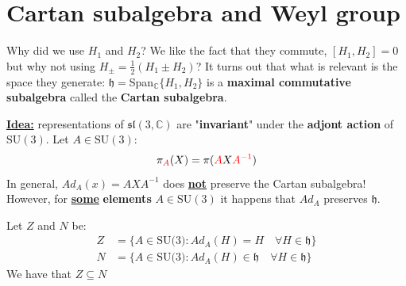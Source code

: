 \documentclass[../main.tex]{subfiles}
\begin{document}
\section{Cartan subalgebra and Weyl group}
Why did we use $H_1$ and $H_2$? We like the fact that they commute, $[H_1,H_2]=0$ but why not using $H_\pm=\frac{1}{2}(H_1\pm H_2)$? It turns out that what is relevant is the space they generate: $\mathfrak{h}=$Span$_{\mathbb{C}}\{H_1,H_2\}$ is a \textbf{maximal commutative subalgebra} called the \textbf{Cartan subalgebra}.

 \underline{\textbf{Idea:}} representations of $\mathfrak{sl}(3,\mathbb{C})$ are "\textbf{invariant}" under the \textbf{adjont action} of $\textrm{SU}(3)$. Let $A\in\textrm{SU}(3)$:
\[
\pi_{\color{red}A}(X)=\pi({\color{red}A}X{\color{red}A^{-1}})
\]
In general, $Ad_A(x)=AXA^{-1}$ does \underline{\textbf{not}} preserve the Cartan subalgebra! However, for \underline{\textbf{some}} \textbf{elements} {\color{red}$A\in\textrm{SU}(3)$} it happens that $Ad_A$ preserves $\mathfrak{h}$.
\begin{definition} Let $Z$ and $N$ be:
\[
\begin{split}
Z&=\{A\in\text{SU(3)}:Ad_A(H)=H \quad \forall H\in\mathfrak{h}\}\\
N&=\{A\in\text{SU(3)}:Ad_A(H)\in\mathfrak{h} \quad \forall H\in\mathfrak{h}\}
\end{split}
\]
We have that $Z\subseteq N$
\end{definition}
\end{document}
